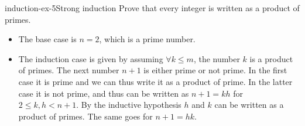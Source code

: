 \documentclass[preview]{standalone}
\begin{document}
\begin{snippetexercise}{induction-ex-5}{Strong induction}
    Prove that every integer is written as a product of primes.
    \begin{itemize}
        \item The base case is \(n=2\), which is a prime number.
        \item The induction case is given by assuming \(\forall k \leq m\),
        the number \(k\) is a product of primes. The next number \(n+1\)
        is either prime or not prime. In the first case it is prime and we can thus
        write it as a product of prime. In the latter case it is not prime, and thus can be written
        as \(n+1 = kh\) for \(2\leq k,h< n+1\).
        By the inductive hypothesis \(h\) and \(k\) can be written as a product of primes.
        The same goes for \(n+1=hk\). 
    \end{itemize}
\end{snippetexercise}
\end{document}

